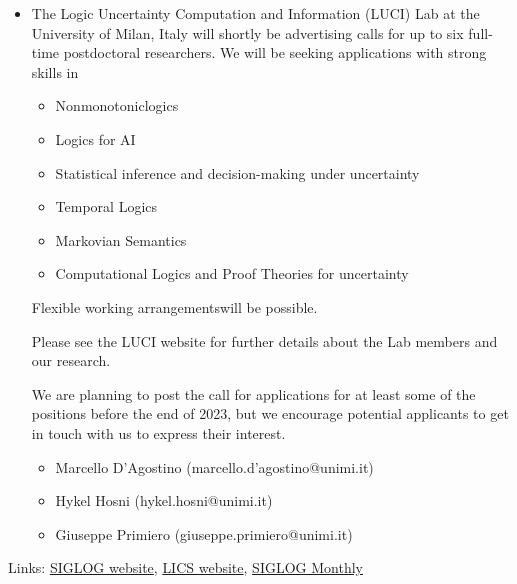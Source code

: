 \documentclass[prodmode,acmtecs]{acmsmall} %
\begin{document}
\begin{itemize}\item  The Logic Uncertainty Computation and Information (LUCI) Lab at the University of Milan, Italy will shortly be advertising calls for up to six full-time postdoctoral researchers. We will be seeking applications with strong skills in  
 
\begin{itemize}\item  Nonmonotoniclogics
\item  Logics for AI 
\item  Statistical inference and decision-making under uncertainty
\item  Temporal Logics
\item  Markovian Semantics
\item  Computational Logics and Proof Theories for uncertainty 
\end{itemize} 
  Flexible working arrangementswill be possible. 
 
  Please see the LUCI website for further details about the Lab members and our research. 
 
  We are planning to post the call for applications for at least some of the positions before the end of 2023, but we encourage potential applicants to get in touch with us to express their interest. 
 
\begin{itemize}\item  Marcello D’Agostino (marcello.d’agostino@unimi.it)
\item  Hykel Hosni (hykel.hosni@unimi.it)
\item  Giuseppe Primiero (giuseppe.primiero@unimi.it) 
\end{itemize} 
\end{itemize}


\bigskip Links: \href{http://siglog.org/}{SIGLOG website}, \href{https://lics.siglog.org}{LICS website}, \href{https://lics.siglog.org/newsletters/}{SIGLOG Monthly}
\end{document}
